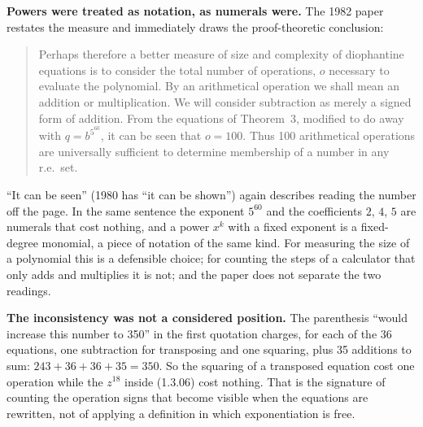 \documentclass[11pt,letterpaper]{article}
\theoremstyle{definition}
\theoremstyle{remark}
\numberwithin{equation}{section}
\begin{document}
\medskip\noindent\textbf{Powers were treated as notation, as numerals were.}
The 1982 paper restates the measure and immediately draws the
proof-theoretic conclusion:
\begin{quote}\small
Perhaps therefore a better measure of size and complexity of diophantine
equations is to consider the total number of operations, $o$ necessary to
evaluate the polynomial. By an arithmetical operation we shall mean an
addition or multiplication. We will consider subtraction as merely a signed
form of addition. From the equations of Theorem~3, modified to do away with
$q=b^{5^{60}}$, it can be seen that $o=100$. Thus 100 arithmetical
operations are universally sufficient to determine membership of a number
in any r.e.\ set. \hfill\cite[p.~553]{J82}
\end{quote}
``It can be seen'' (1980 has ``it can be shown'') again describes reading
the number off the page. In the same sentence the exponent $5^{60}$ and the
coefficients $2$, $4$, $5$ are numerals that cost nothing, and a power $x^k$
with a fixed exponent is a fixed-degree monomial, a piece of notation of the
same kind. For measuring the size of a polynomial this is a defensible
choice; for counting the steps of a calculator that only adds and multiplies
it is not; and the paper does not separate the two readings.

\medskip\noindent\textbf{The inconsistency was not a considered position.}
The parenthesis ``would increase this number to 350'' in the first quotation
charges, for each of the 36 equations, one subtraction for transposing and
one squaring, plus 35 additions to sum: $243+36+36+35=350$. So the squaring
of a transposed equation cost one operation while the $z^{18}$ inside
(1.3.06) cost nothing. That is the signature of counting the operation signs
that become visible when the equations are rewritten, not of applying a
definition in which exponentiation is free.
\end{document}
